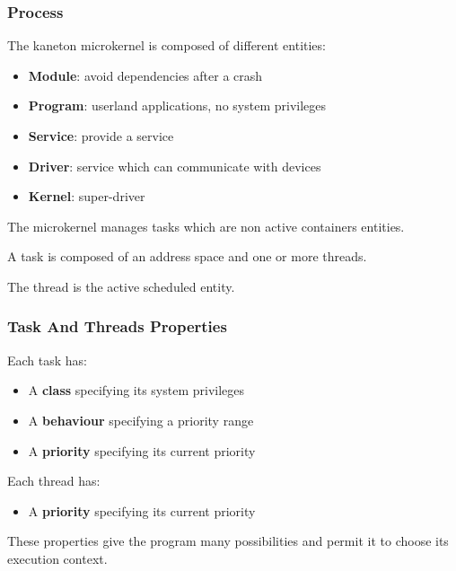\documentclass[8pt]{beamer}
\newcommand{\nl}[0]{\vspace{0.4cm}}
\begin{document}
\begin{frame}
  \frametitle{Process}

  The kaneton microkernel is composed of different entities:

  \begin{itemize}
    \item
      \textbf{Module}: avoid dependencies after a crash
    \item
      \textbf{Program}: userland applications, no system privileges
    \item
      \textbf{Service}: provide a service
    \item
      \textbf{Driver}: service which can communicate with devices
    \item
      \textbf{Kernel}: super-driver
  \end{itemize}

  \nl

  The microkernel manages tasks which are non active containers
  entities.

  \nl

  A task is composed of an address space and one or more threads.

  \nl

  The thread is the active scheduled entity.
\end{frame}


\begin{frame}
  \frametitle{Task And Threads Properties}

  Each task has:

  \begin{itemize}
    \item
      A \textbf{class} specifying its system privileges
    \item
      A \textbf{behaviour} specifying a priority range
    \item
      A \textbf{priority} specifying its current priority
  \end{itemize}

  \nl

  Each thread has:

  \begin{itemize}
    \item
      A \textbf{priority} specifying its current priority
  \end{itemize}

  \nl

  These properties give the program many possibilities and
  permit it to choose its execution context.
\end{frame}
\end{document}
